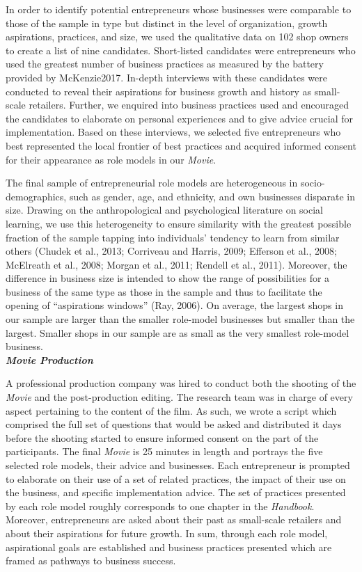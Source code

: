 \documentclass[11.5pt]{article}
\begin{document}
\noindent In order to identify potential entrepreneurs whose businesses were comparable to those of the sample in type but distinct in the level of organization, growth aspirations, practices, and size, we used the qualitative data on 102 shop owners to create a list of nine candidates. Short-listed candidates were entrepreneurs who used the greatest number of business practices as measured by the battery provided by McKenzie2017. In-depth interviews with these candidates were conducted to reveal their aspirations for business growth and history as small-scale retailers. Further, we enquired into business practices used and encouraged the candidates to elaborate on personal experiences and to give advice crucial for implementation. Based on these interviews, we selected five entrepreneurs who best represented the local frontier of best practices and acquired informed consent for their appearance as role models in our \emph{Movie}.

The final sample of entrepreneurial role models are heterogeneous in socio-demographics, such as gender, age, and ethnicity, and own businesses disparate in size. Drawing on the anthropological and psychological literature on social learning, we use this heterogeneity to ensure similarity with the greatest possible fraction of the sample tapping into individuals' tendency to learn from similar others (Chudek et al., 2013; Corriveau and Harris, 2009; Efferson et al., 2008; McElreath et al., 2008; Morgan et al., 2011; Rendell et al., 2011). Moreover, the difference in business size is intended to show the range of possibilities for a business of the same type as those in the sample and thus to facilitate the opening of ``aspirations windows'' (Ray, 2006). On average, the largest shops in our sample are larger than the smaller role-model businesses but smaller than the largest. Smaller shops in our sample are as small as the very smallest role-model business.\\

\noindent \emph{\textbf{Movie Production}}\

\noindent A professional production company was hired to conduct both the shooting of the \emph{Movie} and the post-production editing. The research team was in charge of every aspect pertaining to the content of the film. As such, we wrote a script which comprised the full set of questions that would be asked and distributed it days before the shooting started to ensure informed consent on the part of the participants. The final \emph{Movie} is 25 minutes in length and portrays the five selected role models, their advice and businesses. Each entrepreneur is prompted to elaborate on their use of a set of related practices, the impact of their use on the business, and specific implementation advice. The set of practices presented by each role model roughly corresponds to one chapter in the \emph{Handbook}. Moreover, entrepreneurs are asked about their past as small-scale retailers and about their aspirations for future growth. In sum, through each role model, aspirational goals are established and business practices presented which are framed as pathways to business success. \\
\end{document}

